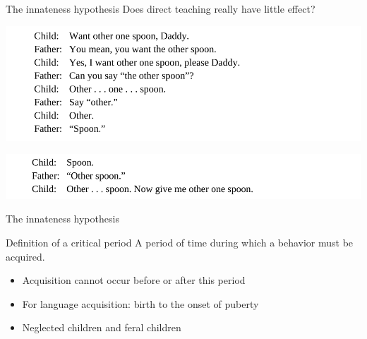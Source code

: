 \documentclass{beamer}
\begin{document}
        \begin{frame}{The innateness hypothesis}
            Does direct teaching really have little effect?
            \begin{example}
                \includegraphics[scale=0.45]{DirectTeaching.PNG}

                \includegraphics[scale=0.445]{DirectTeaching2.PNG}
            \end{example}
        \end{frame}
        \begin{frame}{The innateness hypothesis}
            \begin{block}{Definition of a \alert{critical period}}
                A period of time during which a behavior must be acquired.
            \end{block}
            \begin{itemize}
                \item<2-> Acquisition cannot occur before or after this period
                \item<2-> For language acquisition: \alert{birth to the onset of puberty}
            \end{itemize}
            \begin{itemize}
                \item<4-> Neglected children and \alert{feral children}
            \end{itemize}
        \end{frame}
\end{document}
